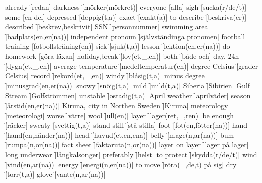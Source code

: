 \begin{questions}
\begin{multicols}{2}
        \question already \f[redan]
        \question darkness \f[mörker(mörkret)]
        \question everyone \f[alla]
        \question sigh \f[sucka(r/de/t)]
        \question some \f[en del]
        \question depressed \f[deppig(t,a)]
        \question exact \f[exakt(a)]
        \question to describe \f[beskriva(er)]
        \question described \f[beskrev,beskrivit]
        \question SSN \f[personnummer]
        \question swimming area \f[badplats(en,er(na))]
        \question independent pronoun \f[självständinga pronomen]
        \question football training \f[fotbollsträning(en)]
        \question sick \f[sjuk(t,a)]
        \question lesson \f[lektion(en,er(na))]
        \question do homework \f[göra läxan]
        \question holiday,break \f[lov(et,\_,en)]
        \question both \f[både och]
        \question day, 24h \f[dygn(et,\_,en)]
        \question average temperature \f[medeltemperatur(en)]
        \question degree Celsius \f[grader Celsius]
        \question record \f[rekord(et,\_,en)]
        \question windy \f[blåsig(t,a)]
        \question minus degree \f[minusgrad(en,er(na))]
        \question snowy \f[snöig(t,a)]
        \question mild \f[mild(t,a)]
        \question Siberia \f[Sibirien]
        \question Gulf Stream \f[Golfströmmen]
        \question unstable \f[ostadig(t,a)]
        \question April weather \f[aprilväder]
        \question season \f[årstid(en,er(na))]
        \question Kiruna, city in Northen Sweden \f[Kiruna]
        \question meteorology \f[meteorologi]
        \question worse \f[värre]
        \question wool \f[ull(en)]
        \question layer \f[lager(ret,\_,ren)]
        \question be enough \f[räcker]
        \question sweaty \f[svettig(t,a)]
        \question stand still \f[stå stilla]
        \question foot \f[fot(en,fötter(na))]
        \question hand \f[hand(en,händer(na))]
        \question head \f[huvud(et,en,ena)]
        \question belly \f[mage(n,ar(na))]
        \question bum \f[rumpa(n,or(na))]
        \question fact sheet \f[faktaruta(n,or(na))]
        \question layer on layer \f[lager på lager]
        \question long underwear \f[långkalsonger]
        \question preferably \f[helst]
        \question to protect \f[skydda(r/de/t)]
        \question wind \f[vind(en,ar(na))]
        \question energy \f[energi(n,er(na))]
        \question to move \f[rör\underline{a}(\_,de,t) på sig]
        \question dry \f[torr(t,a)]
        \question glove \f[vante(n,ar(na))]
    \end{multicols}
\end{questions}
